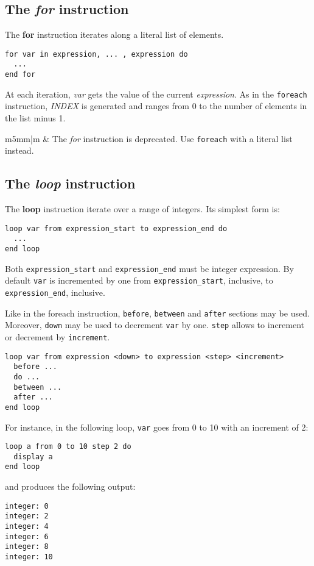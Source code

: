 \documentclass[11pt]{article}
\newcommand{\var}[1]{{\ttfamily\em #1}}
\newcommand\Warning{%
 \makebox[1.4em][c]{%
 \makebox[0pt][c]{\raisebox{.1em}{\small!}}%
 \makebox[0pt][c]{\color{red}\Large$\bigtriangleup$}}}%
\newcommand{\warning}[1]{%
\vspace{1em}
\hspace{-18.3mm}
\rowcolors{1}{white}{light-gray}
\begin{tabular}[b]{m{5mm}|m{\linewidth}}
\Warning & #1\\
\end{tabular}
}
\begin{document}
\subsection{The {\em for} instruction}

The {\bf for} instruction iterates along a literal list of elements.

\begin{lstlisting}
for var in expression, ... , expression do
  ...
end for
\end{lstlisting}

At each iteration, {\em var} gets the value of the current {\em expression}. As in the {\tt foreach} instruction, \var{INDEX} is generated and ranges from 0 to the number of elements in the list minus 1.

\warning{The {\em for} instruction is deprecated. Use \texttt{foreach} with a literal list instead.}

\subsection{The {\em loop} instruction}

The {\bf loop} instruction iterate over a range of integers. Its simplest form is:

\begin{lstlisting}
loop var from expression_start to expression_end do
  ...
end loop
\end{lstlisting}

Both {\tt expression_start} and {\tt expression_end} must be integer expression. By default {\tt var} is incremented by one from {\tt expression_start}, inclusive, to {\tt expression_end}, inclusive. 

Like in the foreach instruction, {\tt before},  {\tt between} and  {\tt after} sections may be used. Moreover, {\tt down} may be used to decrement {\tt var} by one. {\tt step} allows to increment or decrement by {\tt increment}.

\begin{lstlisting}
loop var from expression <down> to expression <step> <increment>
  before ...
  do ...
  between ...
  after ...
end loop
\end{lstlisting}

For instance, in the following loop, {\tt var} goes from 0 to 10 with an increment of 2:

\begin{lstlisting}
loop a from 0 to 10 step 2 do
  display a
end loop
\end{lstlisting}

and produces the following output:

\begin{verbatim}
integer: 0
integer: 2
integer: 4
integer: 6
integer: 8
integer: 10
\end{verbatim}
\end{document}
